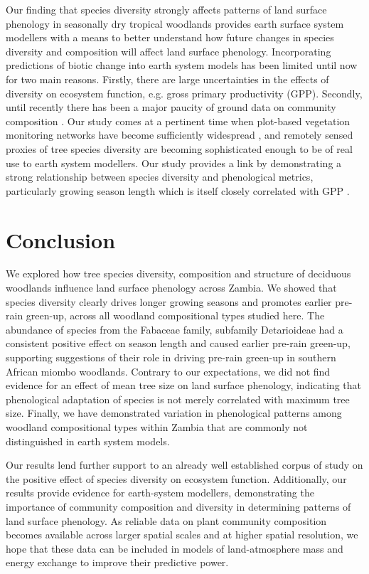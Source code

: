 \documentclass[11pt,a4paper]{article}
\begin{document}
Our finding that species diversity strongly affects patterns of land surface phenology in seasonally dry tropical woodlands provides earth surface system modellers with a means to better understand how future changes in species diversity and composition will affect land surface phenology. Incorporating predictions of biotic change into earth system models has been limited \citep{Ahlstrom2015, Bodegom2011} until now for two main reasons. Firstly, there are large uncertainties in the effects of diversity on ecosystem function, e.g. gross primary productivity (GPP). Secondly, until recently there has been a major paucity of ground data on community composition \citep{}. Our study comes at a pertinent time when plot-based vegetation monitoring networks have become sufficiently widespread \citep{}, and remotely sensed proxies of tree species diversity are becoming sophisticated enough \citep{} to be of real use to earth system modellers. Our study provides a link by demonstrating a strong relationship between species diversity and phenological metrics, particularly growing season length which is itself closely correlated with GPP \citep{Sjostrom2011}. 

\section{Conclusion}

We explored how tree species diversity, composition and structure of deciduous woodlands influence land surface phenology across Zambia. We showed that species diversity clearly drives longer growing seasons and promotes earlier pre-rain green-up, across all woodland compositional types studied here. The abundance of species from the Fabaceae family, subfamily Detarioideae had a consistent positive effect on season length and caused earlier pre-rain green-up, supporting suggestions of their role in driving pre-rain green-up in southern African miombo woodlands. Contrary to our expectations, we did not find evidence for an effect of mean tree size on land surface phenology, indicating that phenological adaptation of species is not merely correlated with maximum tree size. Finally, we have demonstrated variation in phenological patterns among woodland compositional types within Zambia that are commonly not distinguished in earth system models. 

Our results lend further support to an already well established corpus of study on the positive effect of species diversity on ecosystem function. Additionally, our results provide evidence for earth-system modellers, demonstrating the importance of community composition and diversity in determining patterns of land surface phenology. As reliable data on plant community composition becomes available across larger spatial scales and at higher spatial resolution, we hope that these data can be included in models of land-atmosphere mass and energy exchange to improve their predictive power.
\end{document}

